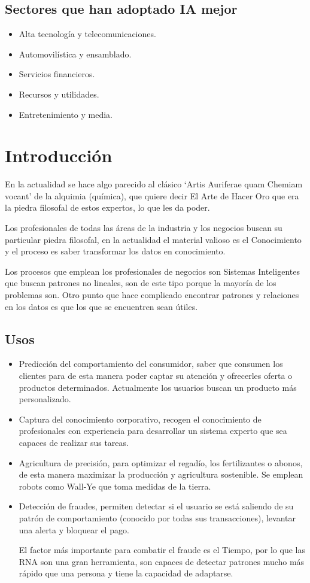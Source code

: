 \documentclass[12pt, twoside, openright]{report} %
\begin{document}
\subsection{Sectores que han adoptado IA mejor}
\begin{itemize}
	\item Alta tecnología y telecomunicaciones.
	\item Automovilística y ensamblado.
	\item Servicios financieros.
	\item Recursos y utilidades.
	\item Entretenimiento y media.
\end{itemize}

\section{Introducción}
En la actualidad se hace algo parecido al clásico ‘Artis Auriferae quam Chemiam vocant’ de la alquimia (química), que quiere decir El Arte de Hacer Oro que era la piedra filosofal de estos expertos, lo que les da poder.

Los profesionales de todas las áreas de la industria y los negocios buscan su particular piedra filosofal, en la actualidad el material valioso es el Conocimiento y el proceso es saber transformar los datos en conocimiento.

Los procesos que emplean los profesionales de negocios son Sistemas Inteligentes que buscan patrones no lineales, son de este tipo porque la mayoría de los problemas son. Otro punto que hace complicado encontrar patrones y relaciones en los datos es que los que se encuentren sean útiles.

\subsection{Usos}
\begin{itemize}
	\item Predicción del comportamiento del consumidor, saber que consumen los clientes para de esta manera poder captar su atención y ofrecerles oferta o productos determinados. Actualmente los usuarios buscan un producto más personalizado.
	\item Captura del conocimiento corporativo, recogen el conocimiento de profesionales con experiencia para desarrollar un sistema experto que sea capaces de realizar sus tareas.
	\item Agricultura de precisión, para optimizar el regadío, los fertilizantes o abonos, de esta manera maximizar la producción y agricultura sostenible. Se emplean robots como Wall-Ye que toma medidas de la tierra.
	\item Detección de fraudes, permiten detectar si el usuario se está saliendo de su patrón de comportamiento (conocido por todas sus transacciones), levantar una alerta y bloquear el pago.

	      El factor más importante para combatir el fraude es el Tiempo, por lo que las RNA son una gran herramienta, son capaces de detectar patrones mucho más rápido que una persona y tiene la capacidad de adaptarse.
\end{itemize}
\pagebreak
\end{document}
